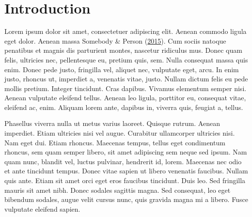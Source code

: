 \documentclass[]{cik}%
\begin{document}
\providecommand{\tightlist}{%
  \setlength{\itemsep}{0pt}\setlength{\parskip}{0pt}}
\providecommand{\EndFirstPage}{%
}


\maketitle

\newpage\ifdefined\Shaded\renewenvironment{Shaded}{\begin{tcolorbox}[interior hidden, sharp corners, borderline west={3pt}{0pt}{shadecolor}, boxrule=0pt, enhanced, frame hidden, breakable]}{\end{tcolorbox}}\fi

\hypertarget{introduction}{%
\section{Introduction}\label{introduction}}

Lorem ipsum dolor sit amet, consectetuer adipiscing elit. Aenean commodo
ligula eget dolor. Aenean massa Somebody \& Person
(\protect\hyperlink{ref-CreativeTag1}{2015}). Cum sociis natoque
penatibus et magnis dis parturient montes, nascetur ridiculus mus. Donec
quam felis, ultricies nec, pellentesque eu, pretium quis, sem. Nulla
consequat massa quis enim. Donec pede justo, fringilla vel, aliquet nec,
vulputate eget, arcu. In enim justo, rhoncus ut, imperdiet a, venenatis
vitae, justo. Nullam dictum felis eu pede mollis pretium. Integer
tincidunt. Cras dapibus. Vivamus elementum semper nisi. Aenean vulputate
eleifend tellus. Aenean leo ligula, porttitor eu, consequat vitae,
eleifend ac, enim. Aliquam lorem ante, dapibus in, viverra quis, feugiat
a, tellus.

Phasellus viverra nulla ut metus varius laoreet. Quisque rutrum. Aenean
imperdiet. Etiam ultricies nisi vel augue. Curabitur ullamcorper
ultricies nisi. Nam eget dui. Etiam rhoncus. Maecenas tempus, tellus
eget condimentum rhoncus, sem quam semper libero, sit amet adipiscing
sem neque sed ipsum. Nam quam nunc, blandit vel, luctus pulvinar,
hendrerit id, lorem. Maecenas nec odio et ante tincidunt tempus. Donec
vitae sapien ut libero venenatis faucibus. Nullam quis ante. Etiam sit
amet orci eget eros faucibus tincidunt. Duis leo. Sed fringilla mauris
sit amet nibh. Donec sodales sagittis magna. Sed consequat, leo eget
bibendum sodales, augue velit cursus nunc, quis gravida magna mi a
libero. Fusce vulputate eleifend sapien.
\end{document}
